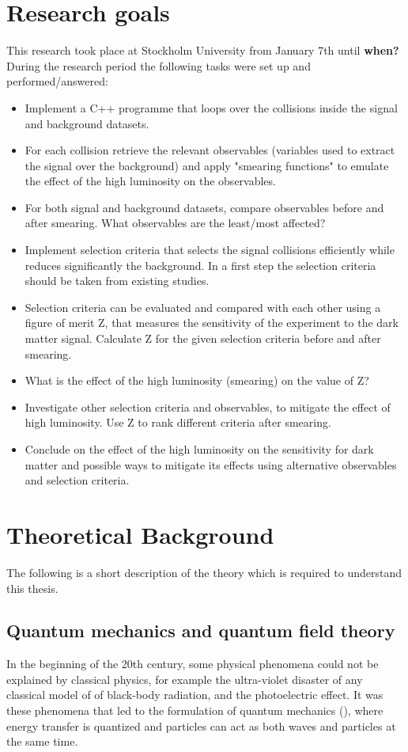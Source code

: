 \section{Research goals}\label{sec:goals}
This research took place at Stockholm University from January 7th until \textbf{when?}
During the research period the following tasks were set up and performed/answered:
\begin{itemize}
\item Implement a C++ programme that loops over the collisions inside the signal and background datasets.	
\item For each collision retrieve the relevant observables (variables used to	 extract the signal over the background) and apply "smearing functions" to emulate the effect of the high luminosity on the observables. 	
\item For both signal and background datasets, compare observables before and after smearing. What observables are the least/most affected?	
\item Implement selection criteria that selects the signal collisions efficiently while reduces significantly the background. In a first step the selection criteria should be taken from existing studies.
\item Selection criteria can be evaluated and compared with each other using a figure of merit Z, that measures the sensitivity of the experiment to the	 dark matter signal. Calculate Z for the given selection criteria before and after smearing.
\item What is the effect of the high luminosity (smearing) on the value of Z?
\item Investigate other selection criteria and observables, to mitigate the effect of high luminosity. Use Z to rank different criteria after smearing.
\item Conclude on the effect of the high luminosity on the sensitivity for dark matter and possible ways to mitigate its effects using alternative observables and selection criteria. 
\end{itemize}
\newpage
\section{Theoretical Background}\label{sec:tb}
The following is a short description of the theory which is required to understand this thesis. 
\subsection{Quantum mechanics and quantum field theory}\label{sec:tb:subsec:qm}
In the beginning of the 20th century, some physical phenomena could not be explained by classical physics, for example the ultra-violet disaster of any classical model of of black-body radiation, and the photoelectric effect.\citep{Bransden:2000}
It was these phenomena that led to the formulation of quantum mechanics (\abbrQM), where energy transfer is quantized and particles can act as both waves and particles at the same time. \citep{Hallsjo:2013}

